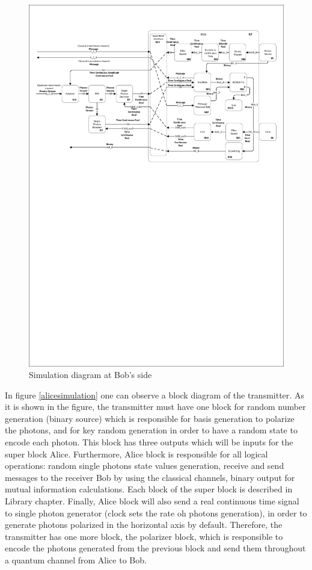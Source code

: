 \begin{figure}[h]
    \centering
        \includegraphics[clip, trim=0.5cm 16cm 0.5cm 2cm, width=1.00\textwidth]{./sdf/bb84_with_discrete_variables/figures_raw/Simulation_Bob_bb84.pdf}
    \caption{Simulation diagram at Bob's side}\label{bobsimulation}
\end{figure}



    In figure \ref{alicesimulation} one can observe a block diagram of the transmitter. As it is shown in the figure, the transmitter must have one block for random number generation (binary source) which is responsible for basis generation to polarize the photons, and for key random generation in order to have a random state to encode each photon. This block has three outputs which will be inputs for the super block Alice. Furthermore, Alice block is responsible for all logical operations: random single photons state values generation, receive and send messages to the receiver Bob by using the classical channels, binary output for mutual information calculations. Each block of the super block is described in Library chapter. Finally, Alice block will also send a real continuous time signal to single photon generator (clock sets the rate oh photons generation), in order to generate photons polarized in the horizontal axis by default. Therefore, the transmitter has one more block, the polarizer block, which is responsible to encode the photons generated from the previous block and send them throughout a quantum channel from Alice to Bob.

